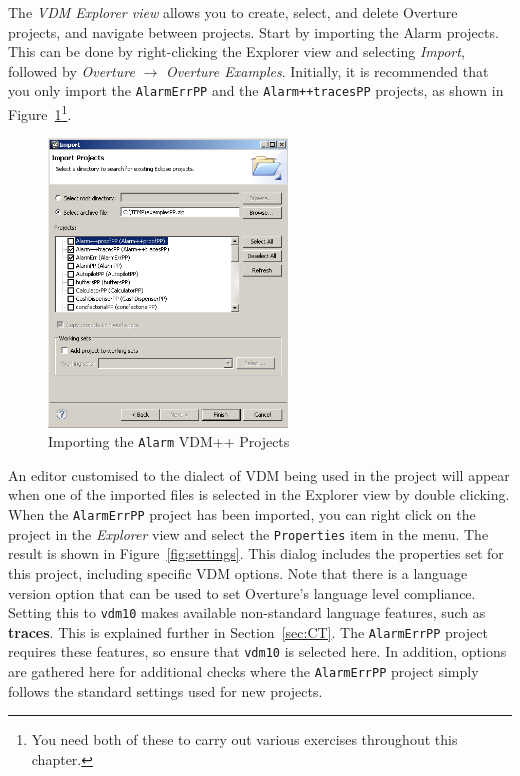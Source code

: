 The \emph{VDM Explorer view} allows you to create, select, and delete Overture projects, and navigate between projects.  Start by importing the Alarm projects.  This can be done by right-clicking the Explorer view and selecting \emph{Import}, followed by \emph{Overture} $\rightarrow$ \emph{Overture Examples}. Initially, it is recommended that you only import the \texttt{AlarmErrPP} and the \texttt{Alarm++tracesPP} projects, as shown in Figure~\ref{fig:importalarm}\footnote{You need both of these to carry out various exercises throughout this chapter.}.
%
\begin{figure}[!htb]
\begin{center}
  \includegraphics[width=2.5in]{figures/importalarmprofs}
  \caption[labelInTOC]{Importing the \texttt{Alarm} VDM++ Projects}
  \label{fig:importalarm}
\end{center}
\end{figure}
%
An editor customised to the dialect of VDM being used in the project will appear when one of the imported files is selected in the Explorer view by double clicking. When the
\texttt{AlarmErrPP} project has been imported, you can right click on the project in the \emph{Explorer} view and select the \texttt{Properties} item in the menu.  The result is shown in Figure~\ref{fig:settings}. This dialog includes the properties set for this project, including specific VDM options. Note that there is a language version option that can be used to set Overture's language level compliance.  Setting this to \texttt{vdm10} makes available non-standard language features, such as {\bf\ttfamily traces}.  This is explained further in Section~\ref{sec:CT}.  The \texttt{AlarmErrPP} project requires these features, so ensure that \texttt{vdm10} is selected here.  In addition, options are gathered here for additional checks where the \texttt{AlarmErrPP} project simply follows the standard settings used for new projects.
